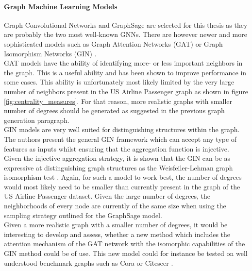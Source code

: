  \paragraph{Graph Machine Learning Models}\mbox{}

  \noindent Graph Convolutional Networks and GraphSage are selected for this
  thesis as they are probably the two most well-known GNNs. There are however 
  newer and more sophisticated models such as Graph Attention Networks (GAT) 
  \citep{velivckovic2018graph} or Graph Isomorphism Networks (GIN) 
  \citep{xu2019powerful}. \\

  \noindent GAT models have the ability of identifying more- or 
  less important neighbors in the graph. This is a useful ability and has been 
  shown to improve performance in some cases. This ability is unfortunately 
  most likely limited by the very large number of neighbors present in the US Airline 
  Passenger graph as shown in figure \ref{fig:centrality_measures}. For that
  reason, more realistic graphs with smaller number of degrees should be
  generated as suggested in the previous graph generation paragraph. \\

  \noindent GIN models are very well suited for distinguishing structures 
  within the graph. The authors \cite{xu2019powerful} present the general GIN
  framework which can accept any type of features as inputs whilst ensuring
  that the aggregation function is injective. Given the injective aggregation
  strategy, it is shown that the GIN can be as expressive at distinguishing
  graph structures as the Weisfeiler-Lehman graph isomorphism test 
  \citep{weisfeiler1968}. Again, for such a model to work best, the number of
  degrees would most likely need to be smaller than currently present in the
  graph of the US Airline Passenger dataset. Given the large number of degrees,
  the neighborhoods of every node are currently of the same size when using the
  sampling strategy outlined for the GraphSage model. \\

  \noindent Given a more realistic graph with a smaller number of degrees, it
  would be interesting to develop and assess, whether a new method which
  includes the attention mechanism of the GAT network with the isomorphic 
  capabilities of the GIN method could be of use. This new model could for
  instance be tested on well understood benchmark graphs such as Cora
  \citep{mccallum2000automating} or Citeseer \citep{giles1998citeseer}. 

